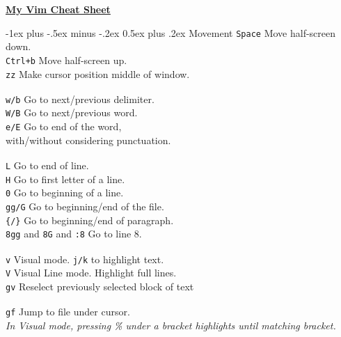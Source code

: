 \documentclass[10pt,landscape]{article}
\makeatletter
\renewcommand{\section}{\@startsection{section}{1}{0mm}%
                                {-1ex plus -.5ex minus -.2ex}%
                                {0.5ex plus .2ex}%
                                {\normalfont\large\bfseries}}
\makeatother
\begin{document}
\raggedright
\begin{multicols}{3}

\setlength{\columnseprule}{0.25pt}
\setlength{\premulticols}{1pt}
\setlength{\postmulticols}{1pt}
\setlength{\multicolsep}{1pt}
\setlength{\columnsep}{2pt}

\begin{center}
     \Large{\underline{\textbf{My Vim Cheat Sheet}}} \\
\end{center}


\section{Movement}
\verb!Space! \hfill Move half-screen down.\\
\verb!Ctrl+b! \hfill Move half-screen up.\\
\verb!zz! \hfill Make cursor position middle of window.\\
\verb! !\\
\verb!w/b! \hfill Go to next/previous delimiter.\\
\verb!W/B! \hfill Go to next/previous word.\\
\verb!e/E! \hfill Go to end of the word, \\ \hfill with/without considering punctuation.\\
\verb! !\\
\verb!L! \hfill Go to end of line.\\
\verb!H! \hfill Go to first letter of a line.\\
\verb!0! \hfill Go to beginning of a line.\\
\verb!gg/G! \hfill Go to beginning/end of the file.\\
\verb!{/}! \hfill Go to beginning/end of paragraph.\\ 
\verb!8gg! and \verb!8G! and \verb!:8! \hfill Go to line 8.\\
\verb! !\\
\verb!v! \hfill Visual mode. \verb!j/k! to highlight text.\\
\verb!V! \hfill Visual Line mode. Highlight full lines.\\
\verb!gv! \hfill Reselect previously selected block of text\\
\verb! !\\
\verb!gf! \hfill Jump to file under cursor. \\
\textit{In Visual mode, pressing \% under a bracket highlights until matching bracket.}\\
\verb! !\\
\verb! !\\
\verb! !\\
\verb! !\\
\verb! !\\
\verb! !\\
\verb! !\\
\verb! !\\



\end{multicols}
\end{document}
